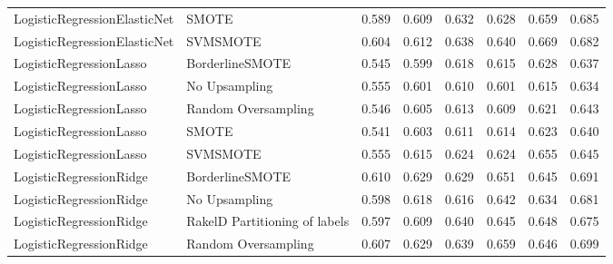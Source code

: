 \begin{tabular}{llllllll}
   LogisticRegressionElasticNet &                         SMOTE & 0.589 &                     0.609 &                 0.632 &                  0.628 &                                   0.659 &     0.685 \\
   LogisticRegressionElasticNet &                      SVMSMOTE & 0.604 &                     0.612 &                 0.638 &                  0.640 &                                   0.669 &     0.682 \\
        LogisticRegressionLasso &               BorderlineSMOTE & 0.545 &                     0.599 &                 0.618 &                  0.615 &                                   0.628 &     0.637 \\
        LogisticRegressionLasso &                 No Upsampling & 0.555 &                     0.601 &                 0.610 &                  0.601 &                                   0.615 &     0.634 \\
        LogisticRegressionLasso &           Random Oversampling & 0.546 &                     0.605 &                 0.613 &                  0.609 &                                   0.621 &     0.643 \\
        LogisticRegressionLasso &                         SMOTE & 0.541 &                     0.603 &                 0.611 &                  0.614 &                                   0.623 &     0.640 \\
        LogisticRegressionLasso &                      SVMSMOTE & 0.555 &                     0.615 &                 0.624 &                  0.624 &                                   0.655 &     0.645 \\
        LogisticRegressionRidge &               BorderlineSMOTE & 0.610 &                     0.629 &                 0.629 &                  0.651 &                                   0.645 &     0.691 \\
        LogisticRegressionRidge &                 No Upsampling & 0.598 &                     0.618 &                 0.616 &                  0.642 &                                   0.634 &     0.681 \\
        LogisticRegressionRidge & RakelD Partitioning of labels & 0.597 &                     0.609 &                 0.640 &                  0.645 &                                   0.648 &     0.675 \\
        LogisticRegressionRidge &           Random Oversampling & 0.607 &                     0.629 &                 0.639 &                  0.659 &                                   0.646 &     0.699 \\

\end{tabular}
